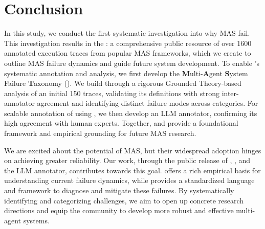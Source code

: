 \section{Conclusion}



In this study, we conduct the first systematic investigation into why MAS fail. This investigation results in the \dataset{}: a comprehensive public resource of over 1600 annotated execution traces from \numMASDomain popular MAS frameworks, which we create to outline MAS failure dynamics and guide future system development. To enable \dataset{}'s systematic annotation and analysis, we first develop the \textbf{M}ulti-\textbf{A}gent \textbf{S}ystem Failure \textbf{T}axonomy (\taxonomy{}). We build \taxonomy{} through a rigorous Grounded Theory-based analysis of an initial 150 traces, validating its definitions with strong inter-annotator agreement and identifying \numFailureMode distinct failure modes across \numFailureArea categories. For scalable annotation of \dataset{} using \taxonomy{}, we then develop an LLM annotator, confirming its high agreement with human experts. Together, \dataset{} and \taxonomy{} provide a foundational framework and empirical grounding for future MAS research.

We are excited about the potential of MAS, but their widespread adoption hinges on achieving greater reliability. Our work, through the public release of \dataset{}, \taxonomy{}, and the LLM annotator, contributes towards this goal. \dataset{} offers a rich empirical basis for understanding current failure dynamics, while \taxonomy{} provides a standardized language and framework to diagnose and mitigate these failures. By systematically identifying and categorizing challenges, we aim to open up concrete research directions and equip the community to develop more robust and effective multi-agent systems.